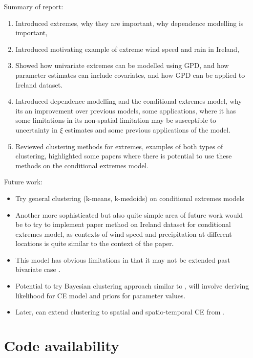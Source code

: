 \documentclass{article}
\numberwithin{equation}{section}
\begin{document}
Summary of report:
\begin{enumerate}
  \item Introduced extremes, why they are important, why dependence modelling is important,
  \item Introduced motivating example of extreme wind speed and rain in Ireland,
  \item Showed how univariate extremes can be modelled using GPD, and how parameter estimates can include covariates, and how GPD can be applied to Ireland dataset. 
  \item Introduced dependence modelling and the conditional extremes model, why its an improvement over previous models, some applications, where it has some limitations in its non-spatial limitation may be susceptible to uncertainty in $\xi$ estimates and some previous applications of the model.
  \item Reviewed clustering methods for extremes, examples of both types of clustering, highlighted some papers where there is potential to use these methods on the conditional extremes model.
\end{enumerate}

Future work:
\begin{itemize}
  \item Try general clustering (k-means, k-medoids) on conditional extremes models
  \item Another more sophisticated but also quite simple area of future work would be to try to implement \cite{Vignotto2021} paper method on Ireland dataset for conditional extremes model, as contexts of wind speed and precipitation at different locations is quite similar to the context of the paper.
  \item This model has obvious limitations in that it may not be extended past bivariate case .
  \item Potential to try Bayesian clustering approach similar to \cite{Rohrbeck2021}, will involve deriving likelihood for CE model and priors for parameter values. 
  \item Later, can extend clustering to spatial and spatio-temporal CE from \cite{Tawn2018}.
\end{itemize}

\section{Code availability}
\end{document}
